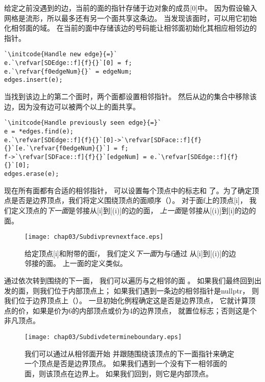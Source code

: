 给定之前没遇到的边，当前的面的指针存储于边对象的成员{\ttfamily{}[0]}中。
因为假设输入网格是流形，所以最多还有另一个面共享这条边。
当发现该面时，可以用它初始化相邻面的域。
在当前的面中存储该边的号码能让相邻面初始化其相应相邻边的指针。
\begin{lstlisting}
`\initcode{Handle new edge}{=}`
e.`\refvar[SDEdge::f]{f}{}`[0] = f;
e.`\refvar{f0edgeNum}{}` = edgeNum;
edges.insert(e);
\end{lstlisting}

当找到该边上的第二个面时，两个面都设置相邻指针。
然后从边的集合中移除该边，因为没有边可以被两个以上的面共享。
\begin{lstlisting}
`\initcode{Handle previously seen edge}{=}`
e = *edges.find(e);
e.`\refvar[SDEdge::f]{f}{}`[0]->`\refvar[SDFace::f]{f}{}`[e.`\refvar{f0edgeNum}{}`] = f;
f->`\refvar[SDFace::f]{f}{}`[edgeNum] = e.`\refvar[SDEdge::f]{f}{}`[0];
edges.erase(e);
\end{lstlisting}

现在所有面都有合适的相邻指针，
可以设置每个顶点中的标志和
了。为了确定顶点是否是边界顶点，我们将定义围绕顶点的面顺序（）。
对于面{\ttfamily f}上的顶点{\ttfamily{}[i]}，
我们定义顶点的\emph{下一面}是邻接从{\ttfamily{}[i]}到{\ttfamily{}[(i)]}的边的面，
\emph{上一面}是邻接从{\ttfamily{}[(i)]}到{\ttfamily{}[i]}的边的面。
\begin{figure}[htbp]
    \centering\texttt{[image: chap03/Subdivprevnextface.eps]}
    \caption{给定顶点{\ttfamily{}[i]}和附带的面{\ttfamily f}，
    我们定义\emph{下一面}为与{\ttfamily f}通过
    从{\ttfamily\protect{}[i]}到{\ttfamily\protect{}[\protect{}(i)]}的边邻接的面。
    上一面的定义类似。}
    \label{fig:3.29}
\end{figure}

通过依次转到围绕的下一面，
我们可以遍历与之相邻的面
。
如果我们最终回到出发的面，则我们位于内部顶点上；
如果我们遇到一条边的相邻指针是{\ttfamily nullptr}，
则我们位于边界顶点上（）。
一旦初始化例程确定这是否是边界顶点，
它就计算顶点的价，如果是价为6的内部顶点或价为4的边界顶点，
就置位标志；否则这是个非凡顶点。
\begin{figure}[htbp]
    \centering\texttt{[image: chap03/Subdivdetermineboundary.eps]}
    \caption{我们可以通过从相邻面\protect{}开始
        并跟随围绕该顶点的下一面指针来确定一个顶点是否是边界顶点。
        如果我们遇到一个没有下一相邻面的面，则该顶点在边界上。
        如果我们回到\protect{}，则它是内部顶点。}
    \label{fig:3.30}
\end{figure}

